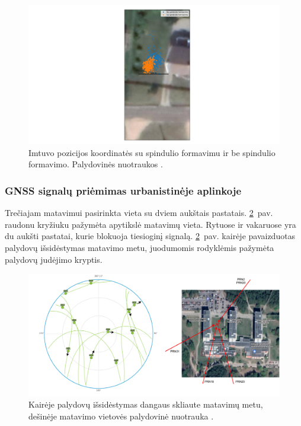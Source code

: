 \documentclass[main.tex]{subfiles}
\begin{document}
\begin{figure}[ht]
    \begin{centering}
    \hspace*{-4cm}\includegraphics[scale=0.5]{drawings/one_reflection_map}
    \par\end{centering}
    \protect\caption{\label{fig:single_reflection_map}Imtuvo pozicijos koordinatės su spindulio formavimu ir be spindulio formavimo. Palydovinės nuotraukos \cite{google_maps}.}
\end{figure}

\subsubsection{GNSS signalų priėmimas urbanistinėje aplinkoje}\label{sec:gnss_meas_two_reflection}

Trečiajam matavimui pasirinkta vieta su dviem aukštais pastatais.
\ref{fig:two_reflection_sat_pos}~pav. raudonu kryžiuku pažymėta apytikslė matavimų
vieta. Rytuose ir vakaruose yra du aukšti pastatai, kurie blokuoja tiesioginį signalą. 
\ref{fig:two_reflection_sat_pos}~pav. kairėje pavaizduotas palydovų išsidėstymas
matavimo metu, juodumomis rodyklėmis pažymėta palydovų judėjimo kryptis.

\begin{figure}[ht]
    \begin{centering}
    \includegraphics[scale=0.4]{drawings/vu_sats_map.drawio}
    \par\end{centering}
    \protect\caption{\label{fig:two_reflection_sat_pos}Kairėje palydovų išsidėstymas dangaus skliaute matavimų metu, dešinėje matavimo vietovės palydovinė nuotrauka \cite{google_maps}.}
\end{figure}
\end{document}
